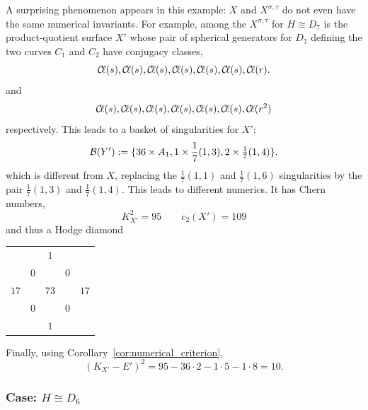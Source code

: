 \documentclass[main.tex]{subfiles}
\begin{document}
\begin{example} \label{example:twists_have_different_numerics}
A surprising phenomenon appears in this example: $X$ and $X^{\sigma, \tau}$ do not even have the same numerical invariants. For example, among the $X^{\sigma, \tau}$ for $H \cong D_7$ is the product-quotient surface $X'$ whose pair of spherical generators for $D_7$ defining the two curves $C_1$ and $C_2$ have conjugacy classes,
\[ \operatorname{\mathcal{C}\!{\ell}}(s), \operatorname{\mathcal{C}\!{\ell}}(s), \operatorname{\mathcal{C}\!{\ell}}(s), \operatorname{\mathcal{C}\!{\ell}}(s), \operatorname{\mathcal{C}\!{\ell}}(s), \operatorname{\mathcal{C}\!{\ell}}(s), \operatorname{\mathcal{C}\!{\ell}}(r). \]
and
\[ \operatorname{\mathcal{C}\!{\ell}}(s), \operatorname{\mathcal{C}\!{\ell}}(s), \operatorname{\mathcal{C}\!{\ell}}(s), \operatorname{\mathcal{C}\!{\ell}}(s), \operatorname{\mathcal{C}\!{\ell}}(s), \operatorname{\mathcal{C}\!{\ell}}(s), \operatorname{\mathcal{C}\!{\ell}}(r^2) \]
respectively. This leads to a basket of singularities for $X'$:
\[ \mathcal{B}(Y') := \{ 36 \times A_1, 1 \times \frac{1}{7}(1,3), 2 \times \tfrac{1}{7} (1,4) \}. \]
which is different from $X$, replacing the $\frac{1}{7}(1,1)$ and $\frac{1}{7}(1,6)$ singularities by the pair $\frac{1}{7}(1,3)$ and $\frac{1}{7}(1,4)$. This leads to different numerics. It has Chern numbers,
\[ K_{X'}^2 = 95 \quad \quad c_2(X') = 109 \]
and thus a Hodge diamond
\begin{center}
\begin{tabular}{ccccc}
 &  & $1$ &  &  \\
 & $0$ &  & $0$ &  \\
$17$ &  & $73$ &  & $17$ \\
 & $0$ &  & $0$ &  \\
 &  & $1$ &  &  \\
\end{tabular}    
\end{center}
Finally, using Corollary~\ref{cor:numerical_criterion},
\[ (K_{X'} - E')^2 = 95 - 36 \cdot 2 - 1 \cdot 5 - 1 \cdot 8 = 10. \]
\end{example}


\subsubsection{Case: $H \cong D_{6}$} \label{section:case_D6}
\end{document}
